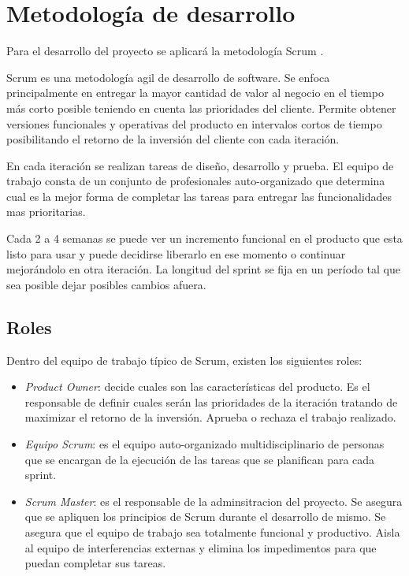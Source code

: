 \documentclass[12pt,a4paper]{article}
\begin{document}
	\section{Metodología de desarrollo}
	
	Para el desarrollo del proyecto se aplicará la metodología Scrum \cite{scrum}.

	Scrum es una metodología agil de desarrollo de software. Se enfoca principalmente en entregar la mayor cantidad de valor al negocio en el tiempo más corto posible teniendo en cuenta las prioridades del cliente. Permite obtener versiones funcionales y operativas del producto en intervalos cortos de tiempo posibilitando el retorno de la inversión del cliente con cada iteración.
	
	En cada iteración se realizan tareas de diseño, desarrollo y prueba. El equipo de trabajo consta de un conjunto de profesionales auto-organizado que determina cual es la mejor forma de completar las tareas para entregar las funcionalidades mas prioritarias.
	
	Cada 2 a 4 semanas se puede ver un incremento funcional en el producto que esta listo para usar y puede decidirse liberarlo en ese momento o continuar mejorándolo en otra iteración. La longitud del sprint se fija en un período tal que sea posible dejar posibles cambios afuera.

	\subsection{Roles}

	Dentro del equipo de trabajo típico de Scrum, existen los siguientes roles:
	
	\begin{itemize}
	\item \textit{Product Owner}: decide cuales son las características del producto. Es el responsable de definir cuales serán las prioridades de la iteración tratando de maximizar el retorno de la inversión. Aprueba o rechaza el trabajo realizado.

	\item \textit{Equipo Scrum}: es el equipo auto-organizado multidisciplinario de personas que se encargan de la ejecución de las tareas que se planifican para cada sprint.

	\item \textit{Scrum Master}: es el responsable de la adminsitracion del proyecto. Se asegura que se apliquen los principios de Scrum durante el desarrollo de mismo. Se asegura que el equipo de trabajo sea totalmente funcional y productivo. Aisla al equipo de interferencias externas y elimina los impedimentos para que puedan completar sus tareas.
	
	\end{itemize}
\end{document}
